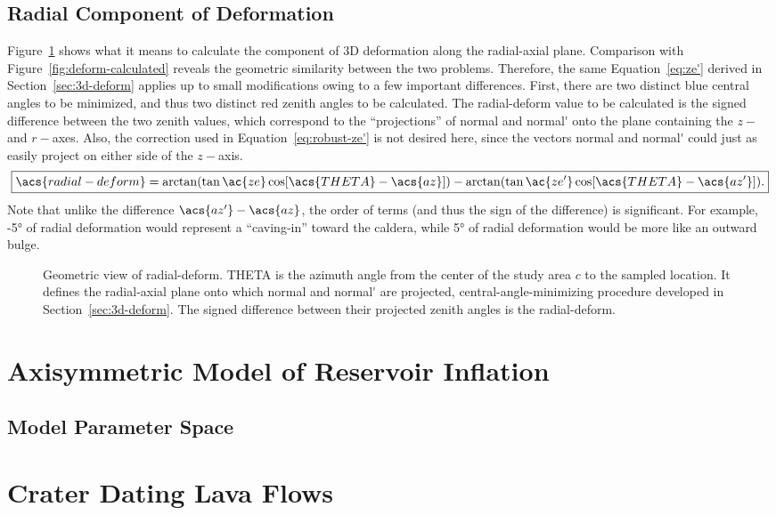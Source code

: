 \subsection{Radial Component of Deformation}
Figure~\ref{fig:radial} shows what it means to calculate the component of 3D deformation along the radial-axial plane. Comparison with Figure~\ref{fig:deform-calculated} reveals the geometric similarity between the two problems. Therefore, the same Equation~\ref{eq:ze'} derived in Section~\ref{sec:3d-deform} applies up to small modifications owing to a few important differences. First, there are two distinct blue central angles to be minimized, and thus two distinct red zenith angles to be calculated. The \acf{radial-deform} value to be calculated is the signed difference between the two zenith values, which correspond to the ``projections'' of \acs{normal} and \acs{normal'} onto the plane containing the $z-$ and $r-$axes. Also, the correction used in Equation~\eqref{eq:robust-ze'} is not desired here, since the vectors \acs{normal} and \acs{normal'} could just as easily project on either side of the $z-$axis.
\begin{equation}
    \boxed{\acs{radial-deform}
    =\arctan(\tan\ac{ze}
    \cos[\acs{THETA}-\acs{az}])
    -\arctan(\tan\ac{ze'}
    \cos[\acs{THETA}-\acs{az'}]).}
\end{equation}
Note that unlike the difference $\acs{az'}-\acs{az}$, the order of terms (and thus the sign of the difference) is significant. For example, \ang{-5} of radial deformation would represent a ``caving-in'' toward the caldera, while \ang{5} of radial deformation would be more like an outward bulge.
\begin{figure}
    \centering
    
    \caption[\Acl{radial-deform} calculation]{Geometric view of \acl{radial-deform}. \acs{THETA} is the azimuth angle from the center of the study area $c$ to the sampled location. It defines the radial-axial plane onto which \acs{normal} and \acs{normal'} are projected, \acs{central-angle}-minimizing procedure developed in Section~\ref{sec:3d-deform}. The signed difference between their projected zenith angles is the \acf{radial-deform}.}
    \label{fig:radial}
\end{figure}

\section{Axisymmetric Model of Reservoir Inflation}
\subsection{Model Parameter Space}

\section{Crater Dating Lava Flows}
